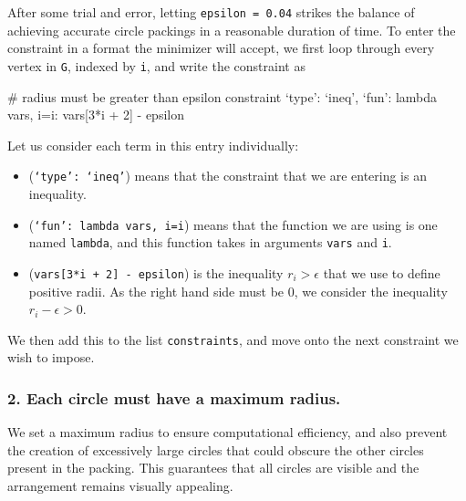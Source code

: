 \begin{flushleft}
After some trial and error, letting \texttt{epsilon = 0.04} strikes the balance of achieving accurate circle packings in a reasonable duration of time. To enter the constraint in a format the minimizer will accept, we first loop through every vertex in \texttt{G}, indexed by \texttt{i}, and write the constraint as 
\end{flushleft}

\begin{code}
    # radius must be greater than epsilon constraint
    {`type': `ineq', `fun': lambda vars, i=i: vars[3*i + 2] - epsilon}
\end{code}

\begin{flushleft}
Let us consider each term in this entry individually:

\begin{itemize}
    \item (\texttt{`type': `ineq'}) means that the constraint that we are entering is an inequality.
    \vspace{-3mm}
    \item (\texttt{`fun': lambda vars, i=i}) means that the function we are using is one named \texttt{lambda}, and this function takes in arguments \texttt{vars} and \texttt{i}.
    \vspace{-3mm}
    \item (\texttt{vars[3*i + 2] - epsilon}) is the inequality $r_i > \epsilon$ that we use to define positive radii. As the right hand side must be 0, we consider the inequality $r_i - \epsilon > 0$.
\end{itemize}

We then add this to the list \texttt{constraints}, and move onto the next constraint we wish to impose. 
\end{flushleft}

\subsubsection{2. Each circle must have a maximum radius.}

\begin{flushleft}
We set a maximum radius to ensure computational efficiency, and also prevent the creation of excessively large circles that could obscure the other circles present in the packing. This guarantees that all circles are visible and the arrangement remains visually appealing. 
\end{flushleft}

